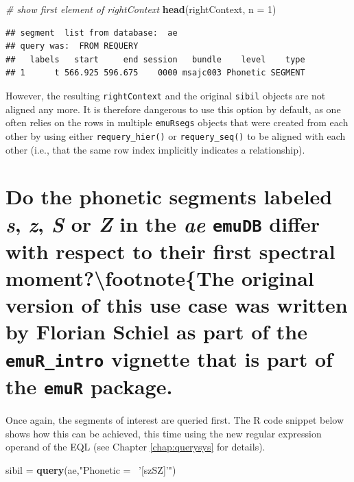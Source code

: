 \documentclass[]{book}
\newenvironment{Shaded}{\begin{snugshade}}{\end{snugshade}}
\newcommand{\CommentTok}[1]{\textcolor[rgb]{0.56,0.35,0.01}{\textit{#1}}}
\newcommand{\DataTypeTok}[1]{\textcolor[rgb]{0.13,0.29,0.53}{#1}}
\newcommand{\DecValTok}[1]{\textcolor[rgb]{0.00,0.00,0.81}{#1}}
\newcommand{\KeywordTok}[1]{\textcolor[rgb]{0.13,0.29,0.53}{\textbf{#1}}}
\newcommand{\NormalTok}[1]{#1}
\newcommand{\StringTok}[1]{\textcolor[rgb]{0.31,0.60,0.02}{#1}}
\begin{document}
\begin{Shaded}
\begin{Highlighting}[]
\CommentTok{# show first element of rightContext}
\KeywordTok{head}\NormalTok{(rightContext, }\DataTypeTok{n =} \DecValTok{1}\NormalTok{)}
\end{Highlighting}
\end{Shaded}

\begin{verbatim}
## segment  list from database:  ae 
## query was:  FROM REQUERY 
##   labels   start     end session   bundle    level    type
## 1      t 566.925 596.675    0000 msajc003 Phonetic SEGMENT
\end{verbatim}

However, the resulting \texttt{rightContext} and the original \texttt{sibil} objects are not aligned any more. It is therefore dangerous to use this option by default, as one often relies on the rows in multiple \texttt{emuRsegs} objects that were created from each other by using either \texttt{requery\_hier()} or \texttt{requery\_seq()} to be aligned with each other (i.e., that the same row index implicitly indicates a relationship).

\hypertarget{sec:app-chap-useCases-q4}{%
\section{\texorpdfstring{Do the phonetic segments labeled \emph{s}, \emph{z}, \emph{S} or \emph{Z} in the \emph{ae} \texttt{emuDB} differ with respect to their first spectral moment?\protect\textbackslash{}footnote\{The original version of this use case was written by Florian Schiel as part of the \texttt{emuR\_intro} vignette that is part of the \texttt{emuR} package.}{Do the phonetic segments labeled s, z, S or Z in the ae emuDB differ with respect to their first spectral moment?\textbackslash{}footnote\{The original version of this use case was written by Florian Schiel as part of the emuR\_intro vignette that is part of the emuR package.}}\label{sec:app-chap-useCases-q4}}

Once again, the segments of interest are queried first. The R code snippet below shows how this can be achieved, this time using the new regular expression operand of the EQL (see Chapter \ref{chap:querysys} for details).

\begin{Shaded}
\begin{Highlighting}[]
\NormalTok{sibil =}\StringTok{ }\KeywordTok{query}\NormalTok{(ae,}\StringTok{"Phonetic =~ '[szSZ]'"}\NormalTok{)}
\end{Highlighting}
\end{Shaded}
\end{document}

